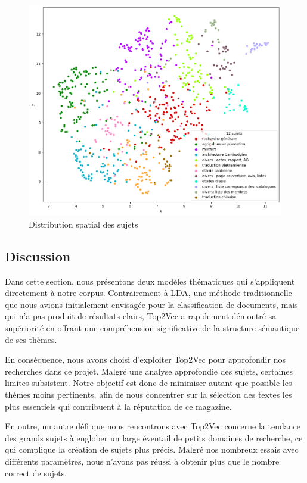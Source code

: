 \begin{figure}[t]
    \centering
    \includegraphics[width=13cm]{img/12umap.png}
    \caption{Distribution spatial des sujets}
    \label{fig:umap12}
\end{figure}

\subsection{Discussion}
Dans cette section, nous présentons deux modèles thématiques qui s'appliquent directement à notre corpus. Contrairement à LDA, une méthode traditionnelle que nous avions initialement envisagée pour la classification de documents, mais qui n'a pas produit de résultats clairs, Top2Vec a rapidement démontré sa supériorité en offrant une compréhension significative de la structure sémantique de ses thèmes. 

En conséquence, nous avons choisi d'exploiter Top2Vec pour approfondir nos recherches dans ce projet. Malgré une analyse approfondie des sujets, certaines limites subsistent. Notre objectif est donc de minimiser autant que possible les thèmes moins pertinents, afin de nous concentrer sur la sélection des textes les plus essentiels qui contribuent à la réputation de ce magazine.

En outre, un autre défi que nous rencontrons avec Top2Vec concerne la tendance des grands sujets à englober un large éventail de petits domaines de recherche, ce qui complique la création de sujets plus précis. Malgré nos nombreux essais avec différents paramètres, nous n'avons pas réussi à obtenir plus que le nombre correct de sujets. 

